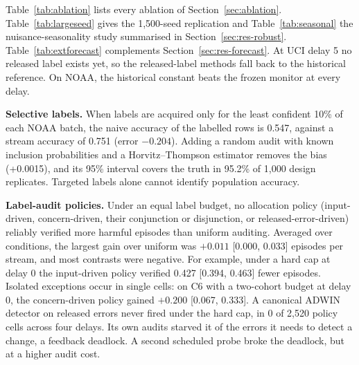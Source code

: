 Table~\ref{tab:ablation} lists every ablation of Section~\ref{sec:ablation}. Table~\ref{tab:largeseed} gives the 1,500-seed replication and Table~\ref{tab:seasonal}
the nuisance-seasonality study summarised in Section~\ref{sec:res-robust}.
Table~\ref{tab:extforecast} complements Section~\ref{sec:res-forecast}. At UCI delay 5
no released label exists yet, so the released-label methods fall back to the
historical reference. On NOAA, the historical constant beats the frozen monitor at
every delay.

\textbf{Selective labels.} When labels are acquired only for the least confident 10\%
of each NOAA batch, the naive accuracy of the labelled rows is 0.547, against a stream
accuracy of 0.751 (error $-0.204$). Adding a random audit with known inclusion
probabilities and a Horvitz--Thompson estimator removes the bias (+0.0015), and its
95\% interval covers the truth in 95.2\% of 1,000 design replicates. Targeted labels
alone cannot identify population accuracy.

\textbf{Label-audit policies.} Under an equal label budget, no allocation policy
(input-driven, concern-driven, their conjunction or disjunction, or
released-error-driven) reliably verified more harmful episodes than uniform auditing.
Averaged over conditions, the largest gain over uniform was $+0.011$ [0.000, 0.033]
episodes per stream, and most contrasts were negative. For example, under a hard cap
at delay 0 the input-driven policy verified 0.427 [0.394, 0.463] fewer episodes.
Isolated exceptions occur in single cells: on C6 with a two-cohort budget at delay 0,
the concern-driven policy gained $+0.200$ [0.067, 0.333]. A canonical ADWIN detector on
released errors never fired under the hard cap, in 0 of 2,520 policy cells across
four delays. Its own audits starved it of the errors it needs to detect a change, a
feedback deadlock. A second scheduled probe broke the deadlock, but at a higher audit
cost.
